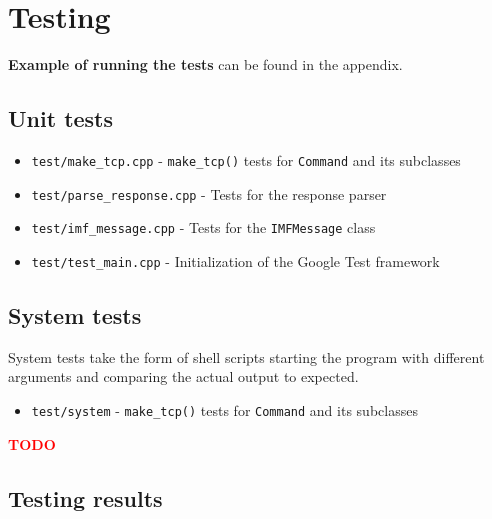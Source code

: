 \documentclass[a4]{report}
\newcommand{\TODO}{
    \textbf{\textcolor{red}{TODO}}
}
\begin{document}
\chapter{Testing}

\textbf{Example of running the tests} can be found in the appendix.

\section{Unit tests}

\begin{itemize}
\item \texttt{test/make\_tcp.cpp} - \texttt{make\_tcp()} tests for \texttt{Command} and its subclasses
\item \texttt{test/parse\_response.cpp} - Tests for the response parser
\item \texttt{test/imf\_message.cpp} - Tests for the \texttt{IMFMessage} class
\item \texttt{test/test\_main.cpp} - Initialization of the Google Test framework
\end{itemize}

\section{System tests}

System tests take the form of shell scripts starting the program with different arguments and comparing the actual output to expected.

\begin{itemize}
\item \texttt{test/system} - \texttt{make\_tcp()} tests for \texttt{Command} and its subclasses
\end{itemize}

\TODO

\section{Testing results}
\end{document}
